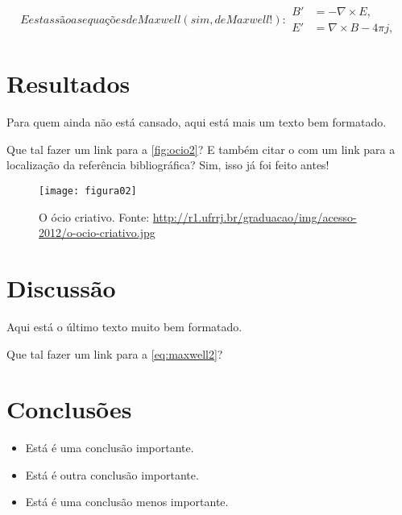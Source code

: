 \begin{subequations}\label{eq:maxwell2}
E estas são as equações de Maxwell (sim, de Maxwell!):
\begin{align}
        B'&=-\nabla \times E,\\
        E'&=\nabla \times B - 4\pi j,
\end{align}
\end{subequations}

\section{Resultados}

Para quem ainda não está cansado, aqui está mais um texto bem formatado. 
\blindtext[1]

Que tal fazer um link para a \autoref{fig:ocio2}? E também citar o 
 com um link para a localização da referência 
bibliográfica? Sim, isso já foi feito antes!

\begin{figure}[!ht]
\centering
\texttt{[image: figura02]}
\caption{\label{fig:ocio2}O ócio criativo. Fonte: 
\url{http://r1.ufrrj.br/graduacao/img/acesso-2012/o-ocio-criativo.jpg}}
\end{figure}

\section{Discussão}

Aqui está o último texto muito bem formatado. \blindtext[2]

Que tal fazer um link para a \autoref{eq:maxwell2}?

\section{Conclusões}

\begin{itemize}
  \item Está é uma conclusão importante.
  \item Está é outra conclusão importante.
  \item Está é uma conclusão menos importante.
\end{itemize}
